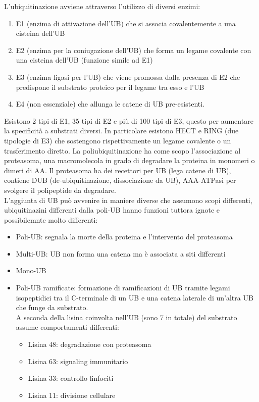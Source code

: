         L'ubiquitinazione avviene attraverso l'utilizzo di diversi enzimi:
        \begin{enumerate}
            \item E1 (enzima di attivazione dell'UB) che si associa covalentemente a una cisteina dell'UB
            \item E2 (enzima per la coniugazione dell'UB) che forma un legame covalente con una cisteina dell'UB (funzione simile ad E1)
            \item E3 (enzima ligasi per l'UB) che viene promossa dalla presenza di E2 che predispone il substrato proteico per il legame tra esso e l'UB
            \item E4 (non essenziale) che allunga le catene di UB pre-esistenti.
        \end{enumerate}
        Esistono 2 tipi di E1, 35 tipi di E2 e più di 100 tipi di E3, questo per aumentare la specificità a substrati diversi. In particolare esistono HECT e RING (due tipologie di E3) che sostengono rispettivamente un legame covalente o un trasferimento diretto. 
        \vspace{0.5cm}
        La poliubiquitinazione ha come scopo l'associazione al proteasoma, una macromolecola in grado di degradare la proteina in monomeri o dimeri di AA. Il proteasoma ha dei recettori per UB (lega catene di UB), contiene DUB (de-ubiquitinazione, dissociazione da UB), AAA-ATPasi per svolgere il polipeptide da degradare.\\
        L'aggiunta di UB può avvenire in maniere diverse che assumono scopi differenti, ubiquitinazini differenti dalla poli-UB hanno funzioni tuttora ignote e possibilemnte molto differenti:
        \begin{itemize}
            \item Poli-UB: segnala la morte della proteina e l'intervento del proteasoma
            \item Multi-UB: UB non forma una catena ma è associata a siti differenti
            \item Mono-UB
            \item Poli-UB ramificate: formazione di ramificazioni di UB tramite legami isopeptidici tra il C-terminale di un UB e una catena laterale di un'altra UB che funge da substrato.\\
            A seconda della lisina coinvolta nell'UB (sono 7 in totale) del substrato assume comportamenti differenti: 
                \begin{itemize}
                    \item Lisina 48: degradazione con proteasoma
                    \item Lisina 63: signaling immunitario
                    \item Lisina 33: controllo linfociti
                    \item Lisina 11: divisione cellulare
                \end{itemize}
        \end{itemize}


